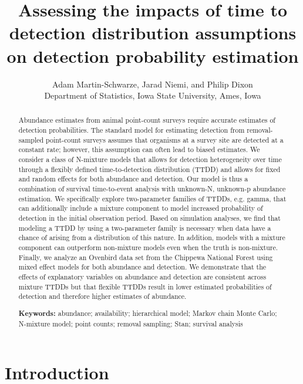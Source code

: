 \documentclass[12pt]{article}
\title{Assessing the impacts of time to detection distribution assumptions on detection probability estimation}
\author{Adam Martin-Schwarze, Jarad Niemi, and Philip Dixon\\
Department of Statistics, Iowa State University, Ames, Iowa}
\begin{document}
\maketitle
\newpage

\begin{abstract}

Abundance estimates from animal point-count surveys require accurate estimates of detection probabilities.  
The standard model for estimating detection from removal-sampled point-count surveys assumes that organisms at a survey site are detected at a constant rate; however, this assumption can often lead to biased estimates.  
We consider a class of N-mixture models that allows for detection heterogeneity over time through a flexibly defined time-to-detection distribution (TTDD) and allows for fixed and random effects for both abundance and detection.
Our model is thus a combination of survival time-to-event analysis with unknown-N, unknown-p abundance estimation.  
We specifically explore two-parameter families of TTDDs, e.g. gamma, that can additionally include a mixture component to model increased probability of detection in the initial observation period.
Based on simulation analyses, we find that modeling a TTDD by using a two-parameter family is necessary when data have a chance of arising from a distribution of this nature.
In addition, models with a mixture component can outperform non-mixture models even when the truth is non-mixture.  
Finally, we analyze an Ovenbird data set from the Chippewa National Forest using mixed effect models for both abundance and detection.
We demonstrate that the effects of explanatory variables on abundance and detection are consistent across mixture TTDDs but that flexible TTDDs result in lower estimated probabilities of detection and therefore higher estimates of abundance. 


{\bf Keywords:} abundance; availability; hierarchical model; Markov chain Monte Carlo; N-mixture model; point counts; removal sampling; Stan; survival analysis

\end{abstract}

\newpage
\section{Introduction}\label{sec:intro}
\end{document}
